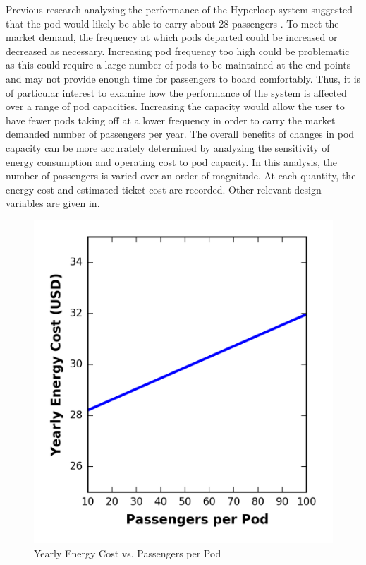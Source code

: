 Previous research analyzing the performance of the Hyperloop system suggested that the pod would likely be able to carry about 28 passengers \cite{Musk}. To meet the market demand, the frequency at which pods departed could be increased or decreased as necessary. Increasing pod frequency too high could be problematic as this could require a large number of pods to be maintained at the end points and may not provide enough time for passengers to board comfortably. Thus, it is of particular interest to examine how the performance of the system is affected over a range of pod capacities. Increasing the capacity would allow the user to have fewer pods taking off at a lower frequency in order to carry the market demanded number of passengers per year. The overall benefits of changes in pod capacity can be more accurately determined by analyzing the sensitivity of energy consumption and operating cost to pod capacity.
In this analysis, the number of passengers is varied over an order of magnitude. At each quantity, the energy cost and estimated ticket cost are recorded. Other relevant design variables are given in.
\begin{figure}
	\centering
	\includegraphics{../../images/graphs/capacity_trades/passengers_vs_energy.png}
	\caption{Yearly Energy Cost vs. Passengers per Pod}
	\label{fig:energy_cost_vs_passengers}
\end{figure}
